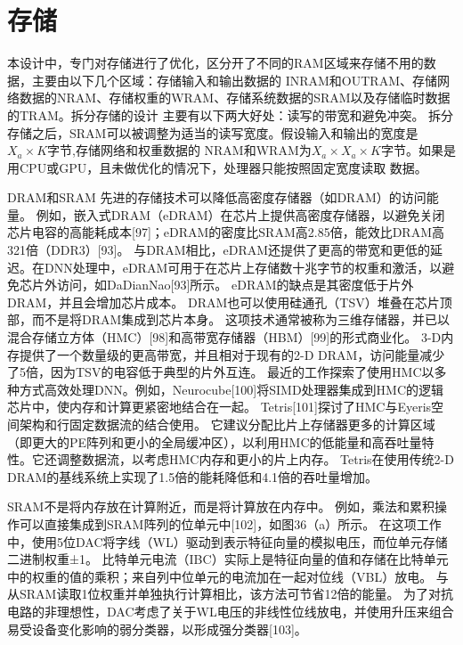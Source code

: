 \section{存储}
本设计中，专门对存储进行了优化，区分开了不同的RAM区域来存储不用的数据，主要由以下几个区域：存储输入和输出数据的
INRAM和OUTRAM、存储网络数据的NRAM、存储权重的WRAM、存储系统数据的SRAM以及存储临时数据的TRAM。拆分存储的设计
主要有以下两大好处：读写的带宽和避免冲突。
拆分存储之后，SRAM可以被调整为适当的读写宽度。假设输入和输出的宽度是$X_a \times K$字节,存储网络和权重数据的
NRAM和WRAM为$X_a \times X_a \times K$字节。如果是用CPU或GPU，且未做优化的情况下，处理器只能按照固定宽度读取
数据。

DRAM和SRAM
先进的存储技术可以降低高密度存储器（如DRAM）的访问能量。
例如，嵌入式DRAM（eDRAM）在芯片上提供高密度存储器，以避免关闭芯片电容的高能耗成本[97]；eDRAM的密度比SRAM高2.85倍，能效比DRAM高321倍（DDR3）[93]。
与DRAM相比，eDRAM还提供了更高的带宽和更低的延迟。在DNN处理中，eDRAM可用于在芯片上存储数十兆字节的权重和激活，以避免芯片外访问，如DaDianNao[93]所示。
eDRAM的缺点是其密度低于片外DRAM，并且会增加芯片成本。
DRAM也可以使用硅通孔（TSV）堆叠在芯片顶部，而不是将DRAM集成到芯片本身。
这项技术通常被称为三维存储器，并已以混合存储立方体（HMC）[98]和高带宽存储器（HBM）[99]的形式商业化。
3-D内存提供了一个数量级的更高带宽，并且相对于现有的2-D DRAM，访问能量减少了5倍，因为TSV的电容低于典型的片外互连。
最近的工作探索了使用HMC以多种方式高效处理DNN。例如，Neurocube[100]将SIMD处理器集成到HMC的逻辑芯片中，使内存和计算更紧密地结合在一起。
Tetris[101]探讨了HMC与Eyeris空间架构和行固定数据流的结合使用。
它建议分配比片上存储器更多的计算区域（即更大的PE阵列和更小的全局缓冲区），以利用HMC的低能量和高吞吐量特性。它还调整数据流，以考虑HMC内存和更小的片上内存。
Tetris在使用传统2-D DRAM的基线系统上实现了1.5倍的能耗降低和4.1倍的吞吐量增加。

SRAM不是将内存放在计算附近，而是将计算放在内存中。
例如，乘法和累积操作可以直接集成到SRAM阵列的位单元中[102]，如图36（a）所示。
在这项工作中，使用5位DAC将字线（WL）驱动到表示特征向量的模拟电压，而位单元存储二进制权重±1。
比特单元电流（IBC）实际上是特征向量的值和存储在比特单元中的权重的值的乘积；来自列中位单元的电流加在一起对位线（VBL）放电。
与从SRAM读取1位权重并单独执行计算相比，该方法可节省12倍的能量。
为了对抗电路的非理想性，DAC考虑了关于WL电压的非线性位线放电，并使用升压来组合易受设备变化影响的弱分类器，以形成强分类器[103]。

